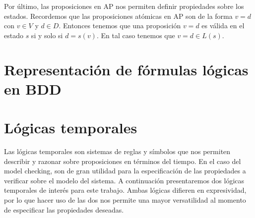 \documentclass[titlepage, 12pt]{book}
\begin{document}
Por \'ultimo, las proposiciones en AP nos permiten definir propiedades sobre los estados. Recordemos que las proposiciones at\'omicas en AP son de la forma $v=d$ con $v \in V$ y $d \in D$. Entonces tenemos que una proposici\'on $v=d$ es v\'alida en el estado $s$ si y solo si $d = s(v)$. En tal caso tenemos que $v=d \in L(s)$.








\section{Representaci\'on de f\'ormulas l\'ogicas en BDD}











\section{L\'ogicas temporales}
Las l\'ogicas temporales son sistemas de reglas y s\'imbolos que nos permiten describir y razonar sobre proposiciones en t\'erminos del tiempo. En el caso del model checking, son de gran utilidad para la especificaci\'on de las propiedades a verificar sobre el modelo del sistema. A continuaci\'on presentaremos dos l\'ogicas temporales de inter\'es para este trabajo. Ambas l\'ogicas difieren en expresividad, por lo que hacer uso de las dos nos permite una mayor versatilidad al momento de especificar las propiedades deseadas.\\
\end{document}
